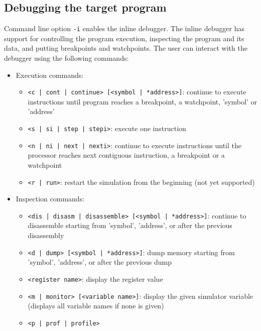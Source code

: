 \subsection{Debugging the target program}
\label{tms320c3x_inline_debug}

Command line option \texttt{-i} enables the inline debugger. The inline debugger has support for controlling the program execution, inspecting the program and its data, and putting breakpoints and watchpoints. The user can interact with the debugger using the following commands:
\begin{itemize}
\item Execution commands:
	\begin{itemize}
	\item \texttt{<c | cont | continue> [<symbol | *address>]}: \newline
	continue to execute instructions until program reaches a breakpoint, a watchpoint, 'symbol' or 'address'
	\item \texttt{<s | si | step | stepi>}: \newline
	execute one instruction
	\item \texttt{<n | ni | next | nexti>}: \newline
	continue to execute instructions until the processor reaches next contiguous instruction, a breakpoint or a watchpoint
	\item \texttt{<r | run>}: \newline
	restart the simulation from the beginning (not yet supported)
	\end{itemize}
\item Inspection commands:
	\begin{itemize}
	\item \texttt{<dis | disasm | disassemble> [<symbol | *address>]}: \newline
	continue to disassemble starting from 'symbol', 'address', or after the previous disassembly
	\item \texttt{<d | dump> [<symbol | *address>]}: \newline
	dump memory starting from 'symbol', 'address', or after the previous dump
	\item \texttt{<register name>}: \newline
	display the register value
	\item \texttt{<m | monitor> [<variable name>]}: \newline
	display the given simulator variable (displays all variable names if none is given)
	\item \texttt{<p | prof | profile>} \newline

\end{itemize}
\end{itemize}
